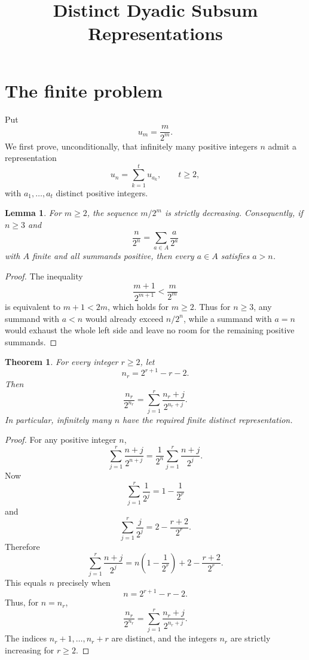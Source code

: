 \documentclass[a4paper,11pt]{amsart}
\title{Distinct Dyadic Subsum Representations}
\author{}
\date{}
\newtheorem{theorem}{Theorem}
\newtheorem{lemma}{Lemma}
\begin{document}
\maketitle

\section{The finite problem}

Put
\[
        u_m=\frac{m}{2^m}.
\]
We first prove, unconditionally, that infinitely many positive integers \(n\)
admit a representation
\[
        u_n=\sum_{k=1}^t u_{a_k},
        \qquad t\geq 2,
\]
with \(a_1,\ldots,a_t\) distinct positive integers.

\begin{lemma}
\label{monotone}
For \(m\geq 2\), the sequence \(m/2^m\) is strictly decreasing.
Consequently, if \(n\geq 3\) and
\[
        \frac n{2^n}=\sum_{a\in A}\frac a{2^a}
\]
with \(A\) finite and all summands positive, then every \(a\in A\) satisfies
\(a>n\).
\end{lemma}

\begin{proof}
The inequality
\[
        \frac{m+1}{2^{m+1}}<\frac m{2^m}
\]
is equivalent to \(m+1<2m\), which holds for \(m\geq 2\).
Thus for \(n\geq 3\), any summand with \(a<n\) would already exceed
\(n/2^n\), while a summand with \(a=n\) would exhaust the whole left side and
leave no room for the remaining positive summands.
\end{proof}

\begin{theorem}
\label{infinite-family}
For every integer \(r\geq 2\), let
\[
        n_r=2^{r+1}-r-2.
\]
Then
\[
        \frac{n_r}{2^{n_r}}
        =
        \sum_{j=1}^{r}\frac{n_r+j}{2^{n_r+j}}.
\]
In particular, infinitely many \(n\) have the required finite distinct
representation.
\end{theorem}

\begin{proof}
For any positive integer \(n\),
\[
        \sum_{j=1}^{r}\frac{n+j}{2^{n+j}}
        =
        \frac1{2^n}\sum_{j=1}^{r}\frac{n+j}{2^j}.
\]
Now
\[
        \sum_{j=1}^{r}\frac1{2^j}=1-\frac1{2^r}
\]
and
\[
        \sum_{j=1}^{r}\frac j{2^j}
        =
        2-\frac{r+2}{2^r}.
\]
Therefore
\[
        \sum_{j=1}^{r}\frac{n+j}{2^j}
        =
        n\left(1-\frac1{2^r}\right)
        +
        2-\frac{r+2}{2^r}.
\]
This equals \(n\) precisely when
\[
        n=2^{r+1}-r-2.
\]
Thus, for \(n=n_r\),
\[
        \frac{n_r}{2^{n_r}}
        =
        \sum_{j=1}^{r}\frac{n_r+j}{2^{n_r+j}}.
\]
The indices \(n_r+1,\ldots,n_r+r\) are distinct, and the integers \(n_r\) are
strictly increasing for \(r\geq 2\).
\end{proof}
\end{document}
